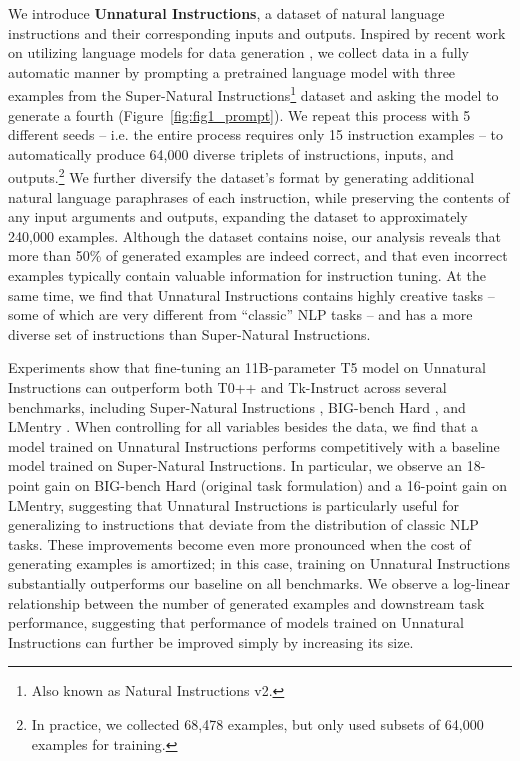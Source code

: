 We introduce \textbf{Unnatural Instructions}, a dataset of natural language instructions and their corresponding inputs and outputs. Inspired by recent work on utilizing language models for data generation \citep{schick-schutze-2021-generating, lee2021neural, liu-etal-2022-wanli}, we collect data in a fully automatic manner by prompting a pretrained language model with three examples from the Super-Natural Instructions\footnote{Also known as Natural Instructions v2.} dataset \cite{mishra-etal-2022-cross, supernaturalinstructions} and asking the model to generate a fourth (Figure~\ref{fig:fig1_prompt}).
We repeat this process with 5 different seeds -- i.e. the entire process requires only 15 instruction examples -- to automatically produce 64,000 diverse triplets of instructions, inputs, and outputs.\footnote{In practice, we collected 68,478 examples, but only used subsets of 64,000 examples for training.} We further diversify the dataset's format by generating additional natural language paraphrases of each instruction, while preserving the contents of any input arguments and outputs, expanding the dataset to approximately 240,000 examples. Although the dataset contains noise, our analysis reveals that more than 50\% of generated examples are indeed correct, and that even incorrect examples typically contain valuable information for instruction tuning. At the same time, we find that Unnatural Instructions contains highly creative tasks -- some of which are very different from ``classic'' NLP tasks -- and has a more diverse set of instructions than Super-Natural Instructions.

Experiments show that fine-tuning an 11B-parameter T5 model \cite{2020t5} on Unnatural Instructions can outperform both T0++ \cite{sanh2021multitask} and Tk-Instruct \cite{supernaturalinstructions} across several benchmarks, including Super-Natural Instructions \cite{supernaturalinstructions}, BIG-bench Hard \cite{bbh}, and LMentry \cite{lmentry}. When controlling for all variables besides the data, we find that a model trained on Unnatural Instructions performs competitively with a baseline model trained on Super-Natural Instructions. In particular, we observe an 18-point gain on BIG-bench Hard (original task formulation) and a 16-point gain on LMentry, suggesting that Unnatural Instructions is particularly useful for generalizing to instructions that deviate from the distribution of classic NLP tasks. These improvements become even more pronounced when the cost of generating examples is amortized; in this case, training on Unnatural Instructions substantially outperforms our baseline on  all benchmarks. We observe a log-linear relationship between the number of generated examples and downstream task performance, suggesting that performance of models trained on Unnatural Instructions can further be improved simply by increasing its size.

